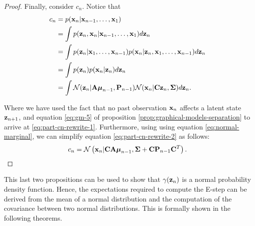 \documentclass[11pt]{article}
\numberwithin{equation}{section}
\newcommand{\x}{{\bf x}}
\newcommand{\z}{{\bf z}}
\newcommand{\N}{\mathcal{N}}
\begin{document}
\begin{proof}
	Finally, consider $c_n$. Notice that
	\begin{align}
		c_n &= p(\x_n \vert \x_{n-1}, \ldots, \x_1)\\
			&= \int p(\z_n, \x_n \vert \x_{n-1}, \ldots, \x_1) d\z_n\\
			&= \int p(\z_n \vert \x_1, \ldots, \x_{n-1}) p (\x_n \vert \z_n, \x_1, \ldots, \x_{n-1}) d\z_n \\
			&= \int p(\z_n) p (\x_n \vert \z_n) d\z_n \label{eq:part-cn-rewrite-1} \\
			&= \int \N(\z_n\vert {\bf A} \boldsymbol\mu_{n-1}, {\bf P}_{n-1}) \N(\x_n \vert {\bf C}\z_n, \boldsymbol\Sigma) d\z_n. \label{eq:part-cn-rewrite-2}
	\end{align}
	
	Where we have used the fact that no past observation $\x_n$ affects a latent state $\z_{n+1}$, and equation \eqref{eq:gm-5} of proposition \ref{prop:graphical-models-separation} to arrive at \eqref{eq:part-cn-rewrite-1}. Furthermore, using using equation \eqref{eq:normal-marginal}, we can  simplify equation \eqref{eq:part-cn-rewrite-2} as follows:
	\begin{equation}
		c_n = \N\left(\x_n \vert {\bf C}{\bf A}\boldsymbol\mu_{n-1}, \boldsymbol\Sigma + {\bf C}{\bf P}_{n-1}{\bf C}^T\right).
	\end{equation}	
\end{proof}


This last two propositions can be used to show that $\gamma(\z_n)$ is a normal probability density function. Hence, the expectations required to compute the E-step can be derived from the mean of a normal distribution and the computation of the covariance between two normal distributions. This is formally shown in the following theorems.
\end{document}
